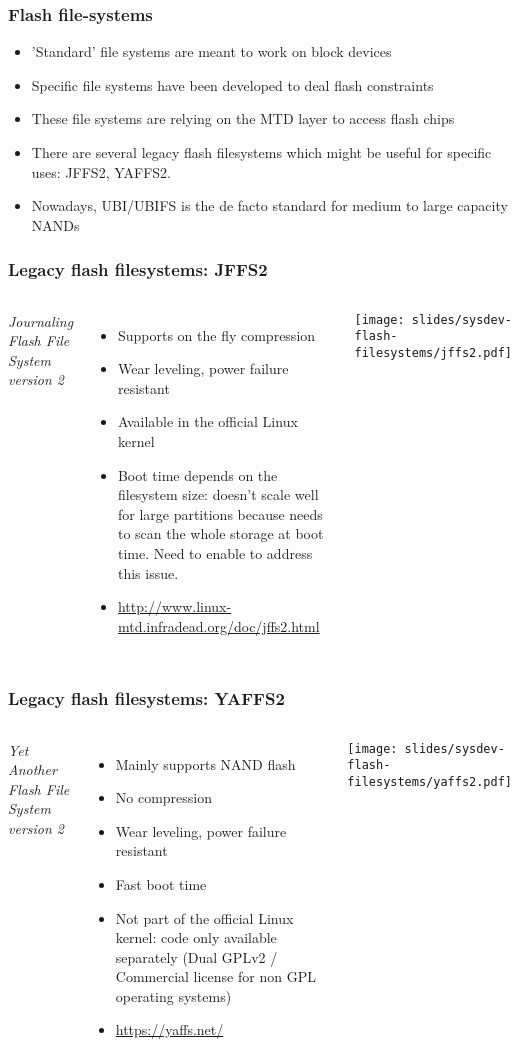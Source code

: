 \begin{frame}
  \frametitle{Flash file-systems}
  \begin{itemize}
  \item 'Standard' file systems are meant to work on block devices
  \item Specific file systems have been developed to deal flash
    constraints
  \item These file systems are relying on the MTD layer to access
    flash chips
  \item There are several legacy flash filesystems which might be
    useful for specific uses: JFFS2, YAFFS2.
  \item Nowadays, UBI/UBIFS is the de facto standard for medium to
    large capacity NANDs
  \end{itemize}
\end{frame}

\begin{frame}
  \frametitle{Legacy flash filesystems: JFFS2}
  \begin{columns}
    {\em Journaling Flash File System version 2}
    \begin{itemize}
    \item Supports on the fly compression
    \item Wear leveling, power failure resistant
    \item Available in the official Linux kernel
    \item Boot time depends on the filesystem size: doesn't scale well
      for large partitions because needs to scan the whole storage at
      boot time. Need to enable  to
      address this issue.
    \item \url{http://www.linux-mtd.infradead.org/doc/jffs2.html}
    \end{itemize}
    \texttt{[image: slides/sysdev-flash-filesystems/jffs2.pdf]}
  \end{columns}
\end{frame}

\begin{frame}
  \frametitle{Legacy flash filesystems: YAFFS2}
  \begin{columns}
    {\em Yet Another Flash File System version 2}
    \begin{itemize}
    \item Mainly supports NAND flash
    \item No compression
    \item Wear leveling, power failure resistant
    \item Fast boot time
    \item Not part of the official Linux kernel: code only available
      separately (Dual GPLv2 / Commercial license for non GPL
      operating systems)
    \item \url{https://yaffs.net/}
    \end{itemize}
    \texttt{[image: slides/sysdev-flash-filesystems/yaffs2.pdf]}
  \end{columns}
\end{frame}



